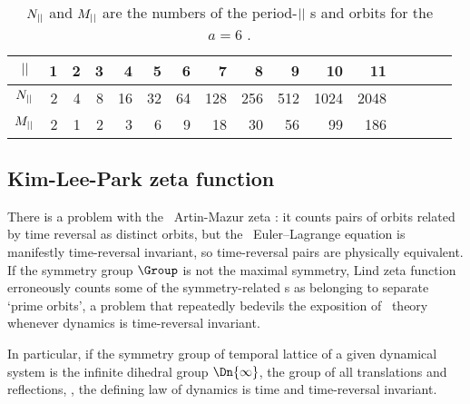 \begin{table}
\begin{tabular}{c|rrrrr|rrrrr|rrrrr}
${||}$ &  1 &  2 &  3 &  4 &  5 &
       6 &  7 &  8 &  9 & 10 &
      11 & \\%
\hline
$N_{||}$ &  2 &  4 &  8 & 16 &  32 &
       64 &  128 &  256 & 512 & 1024 &
      2048 & %
             \rule[-1ex]{0ex}{3.5ex} \\
$M_{||}$ &   2 &   1 &   2 &  3 &  6 &
         9 & 18 &  30 & 56  & 99 &
       186 &  %
\end{tabular}
\bigskip
\caption{\label{tab:LC21HamHenon}
$N_{||}$ and $M_{||}$ are the numbers of
the period-${||}$ {\lattstate}s and
orbits for the ${a}=6$ {\HenonMap}.
}
\end{table}
%

\subsection{Kim-Lee-Park zeta function}
\label{sect:KiLePa}

There is a problem with the \templatt\ Artin-Mazur zeta
: it counts pairs of orbits related by time reversal as
distinct orbits, but the \templatt\ Euler–\-Lagrange equation
 is manifestly time-reversal invariant, so
time-reversal pairs are physically equivalent.
If the symmetry group $\Group$ is not the maximal symmetry, Lind zeta
function erroneously counts some of the symmetry-related {\lattstate}s as
belonging to separate `prime orbits', a problem that repeatedly bedevils
the \wwwcb{} exposition of \po\ theory whenever dynamics is time-reversal
invariant.

In particular, if the symmetry group of temporal lattice of a
given dynamical system is the {infinite dihedral group} $\Dn{\infty}$,
the group of all translations and reflections, \ie, the
defining law of dynamics is time and time-reversal invariant.

